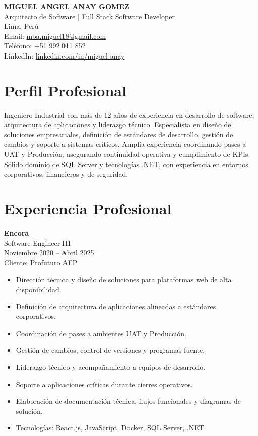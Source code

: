 \documentclass[11pt,a4paper]{article}
\begin{document}
\begin{center}
{\Large \textbf{MIGUEL ANGEL ANAY GOMEZ}}\\
Arquitecto de Software | Full Stack Software Developer\\
Lima, Perú\\
Email: \href{mailto:mba.miguel18@gmail.com}{mba.miguel18@gmail.com} \\
Teléfono: +51 992 011 852\\
LinkedIn: \href{https://www.linkedin.com/in/miguel-anay}{linkedin.com/in/miguel-anay}
\end{center}

\vspace{0.4cm}

\section*{Perfil Profesional}
Ingeniero Industrial con más de 12 años de experiencia en desarrollo de software, arquitectura de aplicaciones y liderazgo técnico. Especialista en diseño de soluciones empresariales, definición de estándares de desarrollo, gestión de cambios y soporte a sistemas críticos. Amplia experiencia coordinando pases a UAT y Producción, asegurando continuidad operativa y cumplimiento de KPIs. Sólido dominio de SQL Server y tecnologías .NET, con experiencia en entornos corporativos, financieros y de seguridad.

\section*{Experiencia Profesional}

\textbf{Encora} \\
Software Engineer III \\
Noviembre 2020 – Abril 2025 \\
Cliente: Profuturo AFP
\begin{itemize}[leftmargin=*]
\item Dirección técnica y diseño de soluciones para plataformas web de alta disponibilidad.
\item Definición de arquitectura de aplicaciones alineadas a estándares corporativos.
\item Coordinación de pases a ambientes UAT y Producción.
\item Gestión de cambios, control de versiones y programas fuente.
\item Liderazgo técnico y acompañamiento a equipos de desarrollo.
\item Soporte a aplicaciones críticas durante cierres operativos.
\item Elaboración de documentación técnica, flujos funcionales y diagramas de solución.
\item Tecnologías: React.js, JavaScript, Docker, SQL Server, .NET.
\end{itemize}
\end{document}

